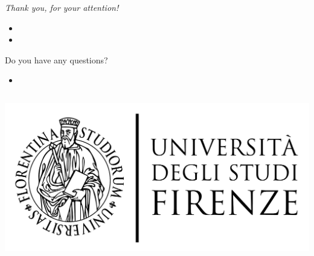 \documentclass{beamer}
\begin{document}
\begin{frame}  %

{\Huge \emph{Thank you, for your attention!}}

\begin{itemize}
  \item[]
  \item[]
\end{itemize}

\LARGE Do you have any questions?

\begin{itemize}
  \item[]
\end{itemize}

\begin{columns}
\includegraphics[width=\linewidth]{../thesis/static/logo/LOGO}\\
\end{columns}

\end{frame}
\end{document}
